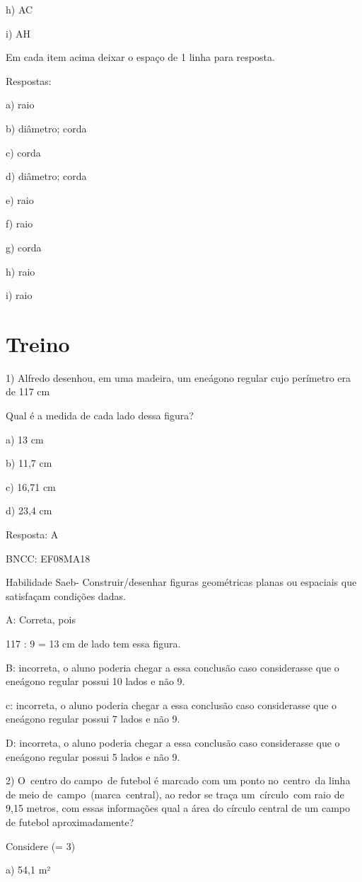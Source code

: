 h) AC

i) AH

Em cada item acima deixar o espaço de 1 linha para resposta.

Respostas:

a) raio

b) diâmetro; corda

c) corda

d) diâmetro; corda

e) raio

f) raio

g) corda

h) raio

i) raio

\section{Treino}

1) Alfredo desenhou, em uma madeira, um eneágono regular cujo perímetro
era de 117 cm

Qual é a medida de cada lado dessa figura?

a) 13 cm

b) 11,7 cm

c) 16,71 cm

d) 23,4 cm

Resposta: A

BNCC: EF08MA18

Habilidade Saeb- Construir/desenhar figuras geométricas planas ou
espaciais que satisfaçam condições dadas.

A: Correta, pois

117 : 9 = 13 cm de lado tem essa figura.

B: incorreta, o aluno poderia chegar a essa conclusão caso considerasse
que o eneágono regular possui 10 lados e não 9.

c: incorreta, o aluno poderia chegar a essa conclusão caso considerasse
que o eneágono regular possui 7 lados e não 9.

D: incorreta, o aluno poderia chegar a essa conclusão caso considerasse
que o eneágono regular possui 5 lados e não 9.

2) O~centro do campo~de futebol é marcado com um ponto no~centro~da
linha de meio de~campo~(marca~central), ao redor se traça um~círculo~com
raio de 9,15 metros, com essas informações qual a área do círculo
central de um campo de futebol aproximadamente?

Considere (\pi = 3)

a) 54,1 m²

